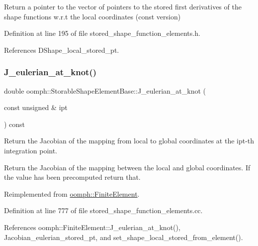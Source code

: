 Return a pointer to the vector of pointers to the stored first derivatives of the shape functions w.\+r.\+t the local coordinates (const version) 



Definition at line 195 of file stored\+\_\+shape\+\_\+function\+\_\+elements.\+h.



References D\+Shape\+\_\+local\+\_\+stored\+\_\+pt.

\mbox{\label{classoomph_1_1StorableShapeElementBase_ad8fbccc3ef6b82a0f50fc1226fec777f}} 
\subsubsection{\texorpdfstring{J\+\_\+eulerian\+\_\+at\+\_\+knot()}{J\_eulerian\_at\_knot()}}
{\footnotesize\ttfamily double oomph\+::\+Storable\+Shape\+Element\+Base\+::\+J\+\_\+eulerian\+\_\+at\+\_\+knot (\begin{DoxyParamCaption}\item[{const unsigned \&}]{ipt }\end{DoxyParamCaption}) const\hspace{0.3cm}{\ttfamily [virtual]}}



Return the Jacobian of the mapping from local to global coordinates at the ipt-\/th integration point. 

Return the Jacobian of the mapping between the local and global coordinates. If the value has been precomputed return that. 

Reimplemented from \hyperlink{classoomph_1_1FiniteElement_aa8a201e448a9200af7f87d612ef01227}{oomph\+::\+Finite\+Element}.



Definition at line 777 of file stored\+\_\+shape\+\_\+function\+\_\+elements.\+cc.



References oomph\+::\+Finite\+Element\+::\+J\+\_\+eulerian\+\_\+at\+\_\+knot(), Jacobian\+\_\+eulerian\+\_\+stored\+\_\+pt, and set\+\_\+shape\+\_\+local\+\_\+stored\+\_\+from\+\_\+element().



